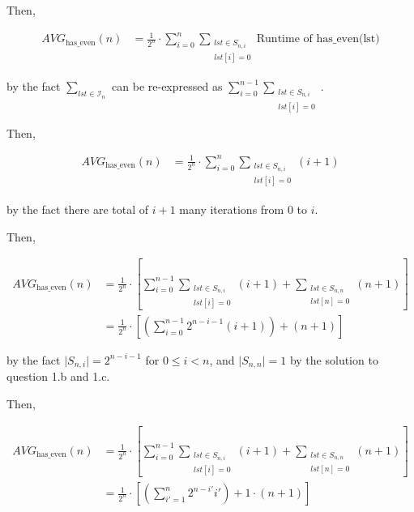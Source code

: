 \documentclass[12pt]{article}
\begin{document}
\begin{enumerate}[a.]
\begin{mdframed}
        \bigskip

        \color{red}
        Then,

        \begin{align}
            AVG_{\text{has\_even}}(n) &= \frac{1}{2^n} \cdot \sum\limits_{i=0}^n \sum\limits_{\substack{lst \in S_{n,i}\\ lst[i]=0}} \text{Runtime of has\_even(lst)}
        \end{align}

        by the fact $\sum\limits_{lst \in \mathcal{I}_n}$ can be re-expressed as $\sum\limits_{i=0}^{n-1} \sum\limits_{\substack{lst \in S_{n,i}\\ lst[i]=0}}$.

        \bigskip

        Then,

        \begin{align}
            AVG_{\text{has\_even}}(n) &= \frac{1}{2^n} \cdot \sum\limits_{i=0}^n \sum\limits_{\substack{lst \in S_{n,i}\\ lst[i]=0}} (i+1)
        \end{align}

        by the fact there are total of $i+1$ many iterations from $0$ to $i$.

        \bigskip

        Then,

        \begin{align}
            AVG_{\text{has\_even}}(n) &= \frac{1}{2^n} \cdot \left[ \sum\limits_{i=0}^{n-1} \sum\limits_{\substack{lst \in S_{n,i}\\ lst[i]=0}} (i+1) +  \sum\limits_{\substack{lst \in S_{n,n}\\ lst[n]=0}} (n+1) \right]\\
            &= \frac{1}{2^n} \cdot \left[ \left(\sum\limits_{i=0}^{n-1} 2^{n-i-1} (i+1) \right) + (n+1) \right]
        \end{align}

        by the fact $\lvert S_{n,i} \rvert = 2^{n-i-1}$ for $0 \leq i < n$, and $\lvert S_{n,n} \rvert = 1$
        by the solution to question 1.b and 1.c.

        \bigskip

        Then,

        \begin{align}
            AVG_{\text{has\_even}}(n) &= \frac{1}{2^n} \cdot \left[ \sum\limits_{i=0}^{n-1} \sum\limits_{\substack{lst \in S_{n,i}\\ lst[i]=0}} (i+1) +  \sum\limits_{\substack{lst \in S_{n,n}\\ lst[n]=0}} (n+1) \right]\\
            &= \frac{1}{2^n} \cdot \left[ \left(\sum\limits_{i'=1}^n 2^{n-i'} i' \right) +  1 \cdot (n+1) \right]
        \end{align}


\end{mdframed}
\end{enumerate}
\end{document}
